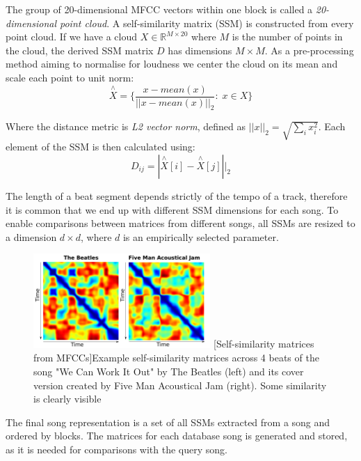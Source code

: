 The group of 20-dimensional MFCC vectors within one block is called a
\textit{20-dimensional point cloud}. A self-similarity matrix (SSM) is
constructed from every point cloud. If we have a cloud $X \in \mathbb{R}^{M
\times 20}$ where $M$ is the number of points in the cloud, the derived SSM
matrix $D$ has dimensions $M \times M$. As a pre-processing method aiming to
normalise for loudness we center the cloud on its mean and scale each point to
unit norm:
\begin{equation}
    \overset{\wedge}{X} = \{\frac{x - mean(x)}{||x - mean(x)||_2}:\; x \in X\}
\end{equation}

Where the distance metric is \textit{L2 vector norm}, defined as $||x||_2 =
\sqrt{\sum_ix_i^2}$. Each element of the SSM is then calculated using:
    \begin{equation}
        D_{ij} = |\overset{\wedge}{X}[i] - \overset{\wedge}{X}[j]||_2
    \end{equation}

The length of a beat segment depends strictly of the tempo of a track, therefore
it is common that we end up with different SSM dimensions for each song. To
enable comparisons between matrices from different songs, all SSMs are resized
to a dimension $d \times d$, where $d$ is an empirically selected parameter.

\begin{figure}[H]
    \centering
    \includegraphics[width=0.6\textwidth]{Algorithms/ssms.png}
    [Self-similarity matrices from MFCCs]{Example self-similarity matrices across 4 beats of the song "We Can Work It Out" by The Beatles (left) and its cover version created by Five Man Acoustical Jam (right). Some similarity is clearly visible \cite{tralie2015cover}}
    \label{fig:ssmexamples}
\end{figure}

The final song representation is a set of all SSMs extracted from a
song and ordered by blocks. The matrices for each database song is generated and
stored, as it is needed for comparisons with the query song.

